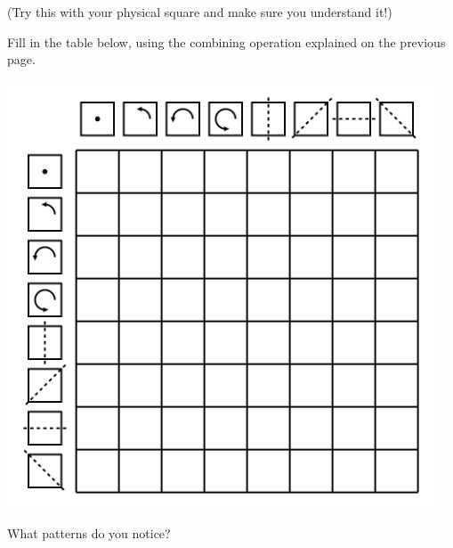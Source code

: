 \documentclass{article}
\begin{document}
(Try this with your physical square and make sure you understand it!)

\newpage

Fill in the table below, using the combining operation explained on
the previous page.

\begin{center}
  \includegraphics[width=5in]{table.png}
\end{center}

What patterns do you notice?
\end{document}
